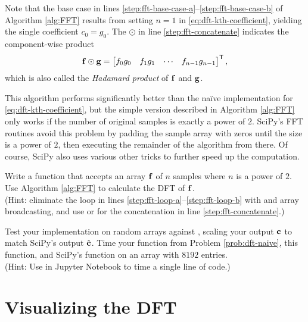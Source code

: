 Note that the base case in lines \ref{step:fft-base-case-a}--\ref{step:fft-base-case-b} of Algorithm \ref{alg:FFT} results from setting $n = 1$ in \eqref{eq:dft-kth-coefficient}, yielding the single coefficient $c_0 = g_0$.
The $\odot$ in line \ref{step:fft-concatenate} indicates the component-wise product
\begin{align*}
\mathbf{f}\odot\mathbf{g} = \begin{bmatrix}f_0g_0 & f_1g_1 & \cdots & f_{n-1}g_{n-1}\end{bmatrix}^{\mathsf T},
\end{align*}
which is also called the \emph{Hadamard product} of $\mathbf{f}$ and $\mathbf{g}$.

This algorithm performs significantly better than the na\"ive implementation for \eqref{eq:dft-kth-coefficient}, but the simple version described in Algorithm \ref{alg:FFT} only works if the number of original samples is exactly a power of $2$.
SciPy's FFT routines avoid this problem by padding the sample array with zeros until the size is a power of $2$, then executing the remainder of the algorithm from there. %
Of course, SciPy also uses various other tricks to further speed up the computation.

\begin{problem} %
Write a function that accepts an array $\mathbf{f}$ of $n$ samples where $n$ is a power of $2$.
Use Algorithm \ref{alg:FFT} to calculate the DFT of $\mathbf{f}$.
\\(Hint: eliminate the loop in lines \ref{step:fft-loop-a}--\ref{step:fft-loop-b} with  and array broadcasting, and use  or  for the concatenation in line \ref{step:fft-concatenate}.)

Test your implementation on random arrays against , scaling your output $\mathbf{c}$ to match SciPy's output $\hat{\mathbf{c}}$.
Time your function from Problem \ref{prob:dft-naive}, this function, and SciPy's function on an array with $8192$ entries.
\\(Hint: Use  in Jupyter Notebook to time a single line of code.)
\label{prob:fft-simple}
\end{problem}

\section*{Visualizing the DFT} %

